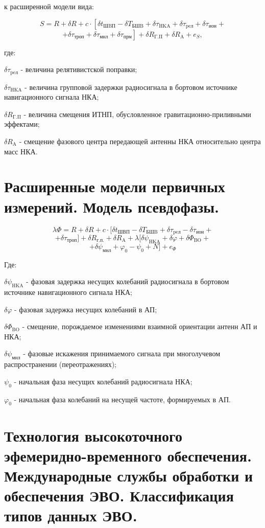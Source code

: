\documentclass[14pt,a4paper,oneside]{extarticle}
\begin{document}
к расширенной модели вида:

\[S=R+\delta R+c\cdot\left[\delta t_{\text{ШBП}}-\delta T_{\text{БШB}}+\delta\tau_{\text{HKA}}+\delta\tau_{\text{peл}}+\delta\tau_{\text{ион}}\right.+\]
        \[\left.+\delta\tau_{\text{троп}}+\delta\tau_{\text{мнл}}+\delta\tau_{\text{прм}}\right]+\delta R_{\mathrm{\Gamma.\Pi}}+\delta R_{\mathrm{A}}+e_{S},\]

где:

$\delta\tau_{\text{peл}}$ - величина релятивистской поправки;

$\delta\tau_{\text{HKA}}$ - величина групповой задержки радиосигнала в бортовом источнике навигационного сигнала НКА;

$\delta R_{\mathrm{\Gamma.\Pi}}$ - величина смещения ИТНП, обусловленное гравитационно-приливными эффектами;

$\delta R_{\mathrm{A}}$ - смещение фазового центра передающей антенны НКА относительно центра масс НКА.



\section{Расширенные модели первичных измерений. Модель псевдофазы.}

\[\lambda\Phi=R+\delta R+c\cdot[\delta t_{\text{ШВП}}-\delta T_{\text{БШB}}+\delta\tau_{\text{peл}}-\delta\tau_{\text{ион}}+\]
        \[+\delta\tau_{\text{троп}}]+\delta R_{\text{г.п.}}+\delta R_{\text{A}}+\lambda[\delta\psi_{\text{HKA}}+\delta\varphi+\delta\Phi_{\text{BO}}+\]
        \[+\delta\psi_{\text{мнл}}+\varphi_{0}-\psi_{0}+N]+e_{\Phi}\]

Где:

$\delta\psi_{\text{HKA}}$ - фазовая задержка несущих колебаний радиосигнала в бортовом источнике навигационного сигнала НКА;

$\delta\varphi$ - фазовая задержка несущих колебаний в АП;

$\delta\Phi_{\text{BO}}$ - смещение, порождаемое изменениями взаимной ориентации антенн АП и НКА;

$\delta\psi_{\text{мнл}}$ - фазовые искажения принимаемого сигнала при многолучевом распространении (переотражениях);

$\psi_{0}$ - начальная фаза несущих колебаний радиосигнала НКА;

$\varphi_{0}$ - начальная фаза колебаний на несущей частоте, формируемых в АП.

\section{Технология высокоточного эфемеридно-временного обеспечения. Международные службы обработки и обеспечения ЭВО. Классификация типов данных ЭВО.}
\end{document}
